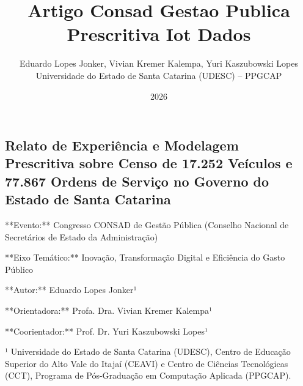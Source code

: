 \documentclass[10pt,a4paper,journal]{article}
\title{Artigo Consad Gestao Publica Prescritiva Iot Dados}
\author{Eduardo Lopes Jonker, Vivian Kremer Kalempa, Yuri Kaszubowski Lopes\\ \small Universidade do Estado de Santa Catarina (UDESC) -- PPGCAP}
\date{2026}
\begin{document}
\maketitle

\subsection{Relato de Experiência e Modelagem Prescritiva sobre Censo de 17.252 Veículos e 77.867 Ordens de Serviço no Governo do Estado de Santa Catarina}
**Evento:** Congresso CONSAD de Gestão Pública (Conselho Nacional de Secretários de Estado da Administração)

**Eixo Temático:** Inovação, Transformação Digital e Eficiência do Gasto Público

**Autor:** Eduardo Lopes Jonker¹

**Orientadora:** Profa. Dra. Vivian Kremer Kalempa¹

**Coorientador:** Prof. Dr. Yuri Kaszubowski Lopes¹

¹ Universidade do Estado de Santa Catarina (UDESC), Centro de Educação Superior do Alto Vale do Itajaí (CEAVI) e Centro de Ciências Tecnológicas (CCT), Programa de Pós-Graduação em Computação Aplicada (PPGCAP).
\end{document}
